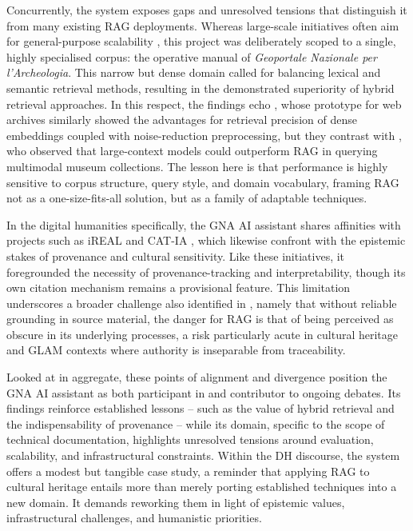 \begin{spacing}{1.5}
Concurrently, the system exposes gaps and unresolved tensions that distinguish it from many existing RAG deployments. Whereas large-scale initiatives often aim for general-purpose scalability \citep{ramos-varela_context_2025,lala_paperqa_2023}, this project was deliberately scoped to a single, highly specialised corpus: the operative manual of \textit{Geoportale Nazionale per l’Archeologia}. This narrow but dense domain called for balancing lexical and semantic retrieval methods, resulting in the demonstrated superiority of hybrid retrieval approaches. In this respect, the findings echo \citet{davis_unlocking_2025}, whose prototype for web archives similarly showed the advantages for retrieval precision of dense embeddings coupled with noise-reduction preprocessing, but they contrast with \citet{ramos-varela_context_2025}, who observed that large-context models could outperform RAG in querying multimodal museum collections. The lesson here is that performance is highly sensitive to corpus structure, query style, and domain vocabulary, framing RAG not as a one-size-fits-all solution, but as a family of adaptable techniques.

In the digital humanities specifically, the GNA AI assistant shares affinities with projects such as iREAL \citep{callaghan_prototyping_2025} and CAT-IA \citep{barbato_nasce_2025}, which likewise confront with the epistemic stakes of provenance and cultural sensitivity. Like these initiatives, it foregrounded the necessity of provenance-tracking and interpretability, though its own citation mechanism remains a provisional feature. This limitation underscores a broader challenge also identified in \citet{pollin_workshop_2024}, namely that without reliable grounding in source material, the danger for RAG is that of being perceived as obscure in its underlying processes, a risk particularly acute in cultural heritage and GLAM contexts where authority is inseparable from traceability.

Looked at in aggregate, these points of alignment and divergence position the GNA AI assistant as both participant in and contributor to ongoing debates. Its findings reinforce established lessons -- such as the value of hybrid retrieval and the indispensability of provenance -- while its domain, specific to the scope of technical documentation, highlights unresolved tensions around evaluation, scalability, and infrastructural constraints. Within the DH discourse, the system offers a modest but tangible case study, a reminder that applying RAG to cultural heritage entails more than merely porting established techniques into a new domain. It demands reworking them in light of epistemic values, infrastructural challenges, and humanistic priorities.


\end{spacing}
